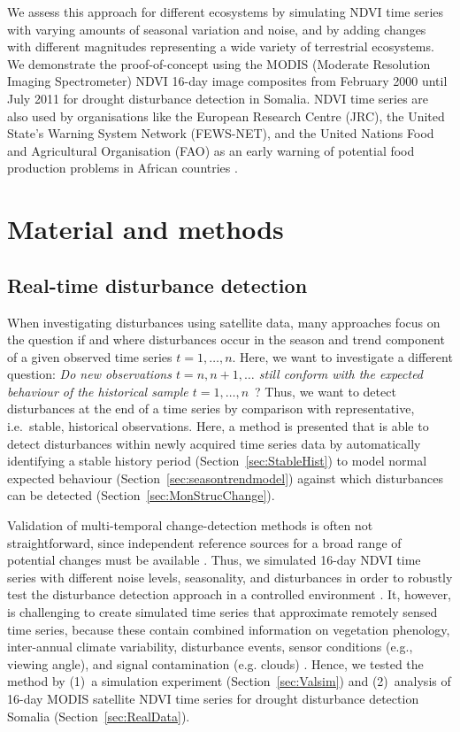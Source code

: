 \documentclass[authoryear,preprint,review,10pt]{elsarticle}
\begin{document}
We assess this approach for different ecosystems by simulating NDVI time series with varying amounts of seasonal variation and noise, and by adding changes with different magnitudes representing a wide variety of terrestrial ecosystems.  We demonstrate the proof-of-concept using the MODIS (Moderate Resolution Imaging Spectrometer) NDVI 16-day image composites from February 2000 until July 2011 for drought disturbance detection in Somalia. NDVI time series are also used by organisations like the European Research Centre (JRC), the United State's Warning System Network (FEWS-NET), and the United Nations Food and Agricultural Organisation (FAO) as an early warning of potential food production problems in African countries \citep{Rojas:2005bz}.
 
\section{Material and methods}

\subsection{Real-time disturbance detection}\label{sec:Method}

When investigating disturbances using satellite data, many approaches \citep[e.g.,][]{deJong:wo,Potter2003, Verbesselt:2010wo, White2009} focus on the question if and where disturbances occur in the season and trend component of a given observed time series $t = 1, \dots, n$. Here, we want to investigate a different question: \emph{Do new observations $t = n, n + 1, \dots$ still conform with the expected behaviour of the historical sample $t = 1, \dots, n$}~? Thus, we want to detect disturbances at the end of a time series by comparison with representative, i.e.\ stable, historical observations. Here, a method is presented that is able to detect disturbances within newly acquired time series data by automatically identifying a stable history period (Section~\ref{sec:StableHist}) to model normal expected behaviour (Section~\ref{sec:seasontrendmodel}) against which disturbances can be detected (Section~\ref{sec:MonStrucChange}).

Validation of multi-temporal change-detection methods is often not straightforward, since independent reference sources for a broad range of potential changes must be available \citep{Kennedy2007}. Thus, we simulated 16-day NDVI time series with different noise levels, seasonality, and disturbances in order to robustly test the disturbance detection approach in a controlled environment \citep{Verbesselt2009a, Verbesselt:2010wo}. It, however, is challenging to create simulated time series that approximate remotely sensed time series, because these contain combined information on vegetation phenology, inter-annual climate variability, disturbance events, sensor conditions (e.g., viewing angle), and signal contamination (e.g. clouds) \citep{Zhang2009}. Hence, we tested the method by (1)~a simulation experiment (Section~\ref{sec:Valsim}) and (2)~analysis of 16-day MODIS satellite NDVI time series for drought disturbance detection Somalia (Section~\ref{sec:RealData}). 
\end{document}

